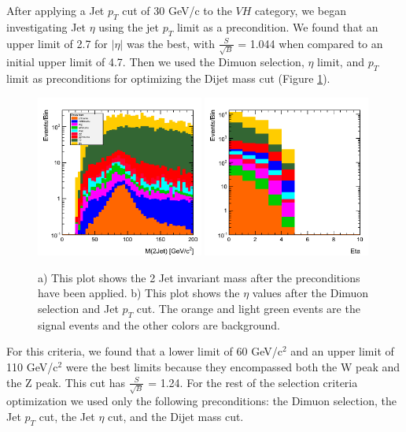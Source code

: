 \documentclass[12pt]{article}
\begin{document}
After applying a Jet $p_{T}$ cut of 30 GeV/c to the $VH$ category, we began investigating Jet $\eta$ using the jet $p_{T}$ limit as a precondition.  
We found that an upper limit of 2.7 for $|\eta|$ was the best, with $\frac{S}{\sqrt{B}}$ = 1.044 when compared to an initial upper limit of 4.7. 
Then we used the Dimuon selection, $\eta$ limit, and $p_{T}$ limit as preconditions for optimizing the Dijet mass cut (Figure \ref{fig:Mjj}).
\begin{figure}[!hbtp]
\begin{center}
    \includegraphics[width=0.49\textwidth]{images/Hist_jetMass.png}
    \includegraphics[width=0.49\textwidth]{images/Hist_jetEta.png}
    \caption{ \label{fig:Mjj}
         a) This plot shows the 2 Jet invariant mass after the preconditions have been applied. b) This plot shows the $\eta$
	 values after the Dimuon selection and Jet $p_{T}$ cut. The orange and light green events are the signal events and the other colors
	 are background.
      }
\end{center}
\end{figure}
For this criteria, we found that a lower limit of 60 GeV/c$^{2}$ and an upper limit of 110 GeV/c$^{2}$ were the best limits 
because they encompassed both the W peak and the Z peak. 
This cut has $\frac{S}{\sqrt{B}}$ = 1.24. For the rest of the selection criteria optimization we used only the following preconditions: 
the Dimuon selection, the Jet $p_{T}$ cut, the Jet $\eta$ cut, and the Dijet mass cut.
\end{document}

